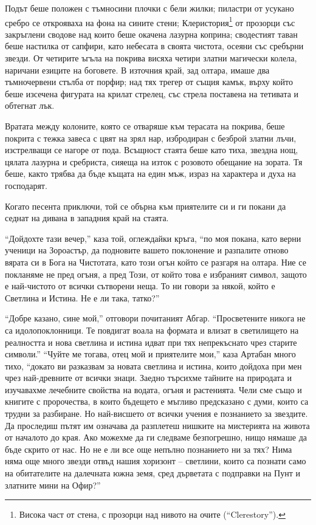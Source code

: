 \documentclass[oneside,10pt]{memoir}
\begin{document}
Подът беше положен с тъмносини плочки с бели жилки; пиластри от усукано сребро
се открояваха на фона на сините стени; Клеристория\footnote{Висока част от
стена, с прозорци над нивото на очите (``Clerestory'').} от прозорци със
закръглени сводове над които беше окачена лазурна коприна; сводестият таван беше
настилка от сапфири, като небесата в своята чистота, осеяни със сребърни звезди.
От четирите ъгъла на покрива висяха четири златни магически колела, наричани
езиците на боговете. В източния край, зад олтара, имаше два тъмночервени стълба
от порфир; над тях трегер от същия камък, върху който беше изсечена фигурата на
крилат стрелец, със стрела поставена на тетивата и обтегнат лък.

Вратата между колоните, която се отваряше към терасата на покрива, беше покрита
с тежка завеса с цвят на зрял нар, избродиран с безброй златни лъчи, изстрелващи
се нагоре от пода. Всъщност стаята беше като тиха, звездна нощ, цялата лазурна и
сребриста, сияеща на изток с розовото обещание на зората. Тя беше, както трябва
да бъде къщата на един мъж, израз на характера и духа на господарят.

Когато песента приключи, той се обърна към приятелите си и ги покани да седнат
на дивана в западния край на стаята.

``Дойдохте тази вечер,'' каза той, оглеждайки кръга, ``по моя покана, като верни
ученици на Зороастър, да подновите вашето поклонение и разпалите отново вярата
си в Бога на Чистотата, като този огън който се разгаря на олтара. Ние се
покланяме не пред огъня, а пред Този, от който това е избраният символ, защото е
най-чистото от всички сътворени неща. То ни говори за някой, който е Светлина и
Истина. Не е ли така, татко?''

``Добре казано, сине мой,'' отговори почитаният Абгар. ``Просветените никога не
са идолопоклонници. Те повдигат воала на формата и влизат в светилището на
реалността и нова светлина и истина идват при тях непрекъснато чрез старите
символи.'' ``Чуйте ме тогава, отец мой и приятелите мои,'' каза Артабан много
тихо, ``докато ви разказвам за новата светлина и истина, които дойдоха при мен
чрез най-древните от всички знаци. Заедно търсихме тайните на природата и
изучавахме лечебните свойства на водата, огъня и растенията. Чели сме също и
книгите с пророчества, в които бъдещето е мъгливо предсказано с думи, които са
трудни за разбиране. Но най-висшето от всички учения е познанието за звездите.
Да проследиш пътят им означава да разплетеш нишките на мистерията на живота от
началото до края. Ако можехме да ги следваме безпогрешно, нищо нямаше да бъде
скрито от нас. Но не е ли все още непълно познанието ни за тях? Нима няма още
много звезди отвъд нашия хоризонт -- светлини, които са познати само на
обитателите на далечната южна земя, сред дърветата с подправки на Пунт и
златните мини на Офир?''
\end{document}
